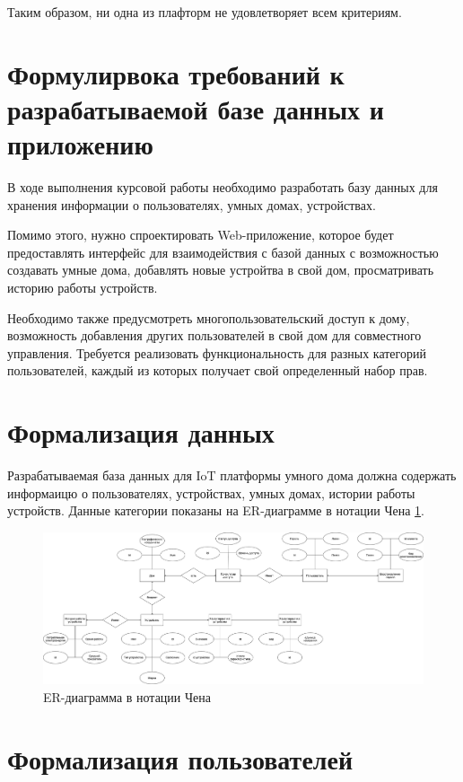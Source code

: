 Таким образом, ни одна из плафторм не удовлетворяет всем критериям. 

\section{Формулирвока требований к разрабатываемой базе данных и приложению}

В ходе выполнения курсовой работы необходимо разработать базу данных для хранения информации 
о пользователях, умных домах, устройствах. 

Помимо этого, нужно спроектировать Web-приложение, 
которое будет предоставлять интерфейс для взаимодействия с базой данных с возможностью создавать умные дома, 
добавлять новые устройтва в свой дом, просматривать историю работы устройств.
    
Необходимо также предусмотреть многопользовательский доступ к дому, возможность добавления других пользователей 
в свой дом для совместного управления. Требуется реализовать функциональность для разных категорий пользователей, 
каждый из которых получает свой определенный набор прав.

\section{Формализация данных}

Разрабатываемая база данных для IoT платформы умного дома должна содержать информаицю о пользователях, устройствах, умных домах,
истории работы устройств. Данные категории показаны на ER-диаграмме в нотации Чена \ref{img:er}.

\begin{figure}[h]
    \includegraphics[width=1\linewidth]{img/er.png}
    \caption{ER-диаграмма в нотации Чена}
    \label{img:er}
\end{figure}
\noindent
\clearpage

\section{Формализация пользователей}

